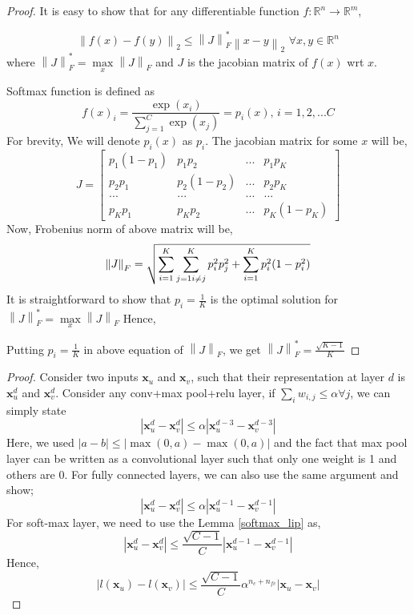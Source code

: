 \documentclass{article}
\begin{document}
\clearpage




\clearpage

\begin{proof}
It is easy to show that for any differentiable function $f:\mathbb{R}^n\rightarrow\mathbb{R}^m$,

\[
\left \|f(x)-f(y)\right \|_2 \leq \left \|J\right \|^*_F \left \|x-y\right\|_2 \, \, \forall x,y\in\mathbb{R}^n
\]
where $\left \|J\right \|^*_F = \max\limits_{x} \left \|J\right \|_F$ and $J$ is the jacobian matrix of $f(x)$ wrt $x$.

Softmax function is defined as
\[
f(x)_i = \frac{\exp(x_i)}{\sum\limits_{j=1}^{C}\exp(x_j)} = p_i(x), \, i={1,2,...C}
\]
For brevity, We will denote $p_i(x)$ as $p_i$. The jacobian matrix for some $x$ will be,
\[
J = \begin{bmatrix} p_1(1-p_1) & p_1p_2  & ... & p_1p_K \\
p_2p_1 & p_2(1-p_2)  & ...  & p_2p_K \\
... & ... & ... & ...  \\
p_{K}p_{1} & p_{K}p_{2}  & ...  & p_{K}(1-p_{K})
\end{bmatrix}
\]
Now, Frobenius norm of above matrix will be,
\[
\left \| J \right \|_F = \sqrt{\sum\limits_{i=1}^{K}\sum\limits_{j=1 \\ i\neq j}^{K}p_{i}^{2}p_{j}^{2} + \sum\limits_{i=1}^{K} p_i^2(1-p_i^2)}
\]
It is straightforward to show that $p_i = \frac{1}{K}$ is the optimal solution for $\left \| J \right \|^{*}_F = \max\limits_{x}\left \| J \right \|_F $ Hence,


Putting $p_i = \frac{1}{K}$ in above equation of $\left \| J \right \|_F$, we get $\left \| J \right \|^{*}_F = \frac{\sqrt{K-1}}{K}$

\end{proof}


\begin{proof}
Consider two inputs $\mathbf{x}_u$ and $\mathbf{x}_v$, such that their representation at layer $d$ is $\mathbf{x}_u^d$ and $\mathbf{x}_v^d$. Consider any conv+max pool+relu layer, if $\sum_i w_{i,j} \leq \alpha \forall j$, we can simply state
\[
|\mathbf{x}_u^d - \mathbf{x}_v^d| \leq  \alpha |\mathbf{x}_u^{d-3} - \mathbf{x}_v^{d-3}|
\] 
Here, we used $|a-b| \leq |\max(0, a) - \max(0,a)|$ and the fact that max pool layer can be written as a convolutional layer such that only one weight is 1 and others are 0. For fully connected layers, we can also use the same argument and show;
\[
|\mathbf{x}_u^d - \mathbf{x}_v^d| \leq  \alpha |\mathbf{x}_u^{d-1} - \mathbf{x}_v^{d-1}|
\] 
For soft-max layer, we need to use the Lemma \ref{softmax_lip} as,
\[
|\mathbf{x}_u^d - \mathbf{x}_v^d| \leq  \frac{\sqrt{C-1}}{C} |\mathbf{x}_u^{d-1} - \mathbf{x}_v^{d-1}|
\] 
Hence,
\[
|l(\mathbf{x}_u) - l(\mathbf{x}_v)| \leq   \frac{\sqrt{C-1}}{C} \alpha^{n_c+n_{fc}}  |\mathbf{x}_u-\mathbf{x}_v|
\]
\end{proof}
\end{document}
